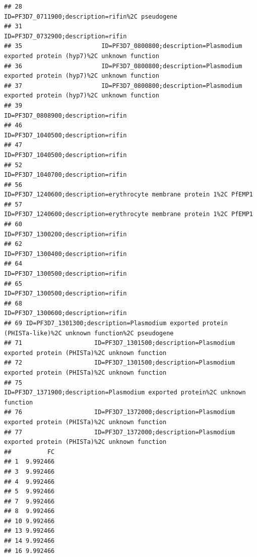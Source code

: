 \documentclass[12pt, a4paper]{article}\usepackage[]{graphicx}\usepackage[]{color}
\makeatletter
\newenvironment{kframe}{%
 \def\at@end@of@kframe{}%
 \ifinner\ifhmode%
  \def\at@end@of@kframe{\end{minipage}}%
  \begin{minipage}{\columnwidth}%
 \fi\fi%
 \def\FrameCommand##1{\hskip\@totalleftmargin \hskip-\fboxsep
 \colorbox{shadecolor}{##1}\hskip-\fboxsep
     \hskip-\linewidth \hskip-\@totalleftmargin \hskip\columnwidth}%
 \MakeFramed {\advance\hsize-\width
   \@totalleftmargin\z@ \linewidth\hsize
   \@setminipage}}%
 {\par\unskip\endMakeFramed%
 \at@end@of@kframe}
\newenvironment{knitrout}{}{} %
\makeatother
\begin{document}
\begin{knitrout}
\begin{kframe}
\begin{verbatim}
## 28                                                         ID=PF3D7_0711900;description=rifin%2C pseudogene
## 31                                                                       ID=PF3D7_0732900;description=rifin
## 35                      ID=PF3D7_0800800;description=Plasmodium exported protein (hyp7)%2C unknown function
## 36                      ID=PF3D7_0800800;description=Plasmodium exported protein (hyp7)%2C unknown function
## 37                      ID=PF3D7_0800800;description=Plasmodium exported protein (hyp7)%2C unknown function
## 39                                                                       ID=PF3D7_0808900;description=rifin
## 46                                                                       ID=PF3D7_1040500;description=rifin
## 47                                                                       ID=PF3D7_1040500;description=rifin
## 52                                                                       ID=PF3D7_1040700;description=rifin
## 56                                    ID=PF3D7_1240600;description=erythrocyte membrane protein 1%2C PfEMP1
## 57                                    ID=PF3D7_1240600;description=erythrocyte membrane protein 1%2C PfEMP1
## 60                                                                       ID=PF3D7_1300200;description=rifin
## 62                                                                       ID=PF3D7_1300400;description=rifin
## 64                                                                       ID=PF3D7_1300500;description=rifin
## 65                                                                       ID=PF3D7_1300500;description=rifin
## 68                                                                       ID=PF3D7_1300600;description=rifin
## 69 ID=PF3D7_1301300;description=Plasmodium exported protein (PHISTa-like)%2C unknown function%2C pseudogene
## 71                    ID=PF3D7_1301500;description=Plasmodium exported protein (PHISTa)%2C unknown function
## 72                    ID=PF3D7_1301500;description=Plasmodium exported protein (PHISTa)%2C unknown function
## 75                             ID=PF3D7_1371900;description=Plasmodium exported protein%2C unknown function
## 76                    ID=PF3D7_1372000;description=Plasmodium exported protein (PHISTa)%2C unknown function
## 77                    ID=PF3D7_1372000;description=Plasmodium exported protein (PHISTa)%2C unknown function
##          FC
## 1  9.992466
## 3  9.992466
## 4  9.992466
## 5  9.992466
## 7  9.992466
## 8  9.992466
## 10 9.992466
## 13 9.992466
## 14 9.992466
## 16 9.992466

\end{verbatim}
\end{kframe}
\end{knitrout}
\end{document}
